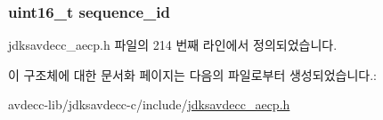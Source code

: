 \subsubsection[{\texorpdfstring{sequence\+\_\+id}{sequence_id}}]{\setlength{\rightskip}{0pt plus 5cm}uint16\+\_\+t sequence\+\_\+id}\hypertarget{structjdksavdecc__aecpdu__common_a8f184eb7c16a6d3a501c383ee8ffa200}{}\label{structjdksavdecc__aecpdu__common_a8f184eb7c16a6d3a501c383ee8ffa200}


jdksavdecc\+\_\+aecp.\+h 파일의 214 번째 라인에서 정의되었습니다.



이 구조체에 대한 문서화 페이지는 다음의 파일로부터 생성되었습니다.\+:\begin{DoxyCompactItemize}
\item 
avdecc-\/lib/jdksavdecc-\/c/include/\hyperlink{jdksavdecc__aecp_8h}{jdksavdecc\+\_\+aecp.\+h}\end{DoxyCompactItemize}
